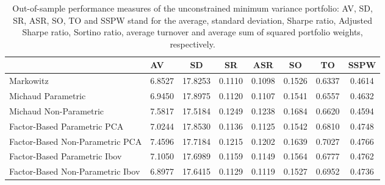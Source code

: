 \begin{table}

\caption{\label{tab:unc_mvp}Out-of-sample performance measures of the unconstrained minimum variance portfolio: AV, SD, SR, ASR, SO, TO and SSPW stand for the average, standard deviation, Sharpe ratio, Adjusted Sharpe ratio, Sortino ratio, average turnover and average sum of squared portfolio weights, respectively.}
\centering
\begin{tabular}[t]{l|l|c|c|c|c|c|c}
\hline
  & AV & SD & SR & ASR & SO & TO & SSPW\\
\hline
Markowitz & 6.8527 & 17.8253 & 0.1110 & 0.1098 & 0.1526 & 0.6337 & 0.4614\\
\hline
Michaud Parametric & 6.9450 & 17.8975 & 0.1120 & 0.1107 & 0.1541 & 0.6557 & 0.4632\\
\hline
Michaud Non-Parametric & 7.5817 & 17.5184 & 0.1249 & 0.1238 & 0.1684 & 0.6620 & 0.4594\\
\hline
Factor-Based Parametric PCA & 7.0244 & 17.8530 & 0.1136 & 0.1125 & 0.1542 & 0.6810 & 0.4748\\
\hline
Factor-Based Non-Parametric PCA & 7.4596 & 17.7184 & 0.1215 & 0.1202 & 0.1639 & 0.7027 & 0.4766\\
\hline
Factor-Based Parametric Ibov & 7.1050 & 17.6989 & 0.1159 & 0.1149 & 0.1564 & 0.6777 & 0.4762\\
\hline
Factor-Based Non-Parametric Ibov & 6.8977 & 17.6415 & 0.1129 & 0.1119 & 0.1527 & 0.6952 & 0.4736\\
\hline
\end{tabular}
\end{table}
